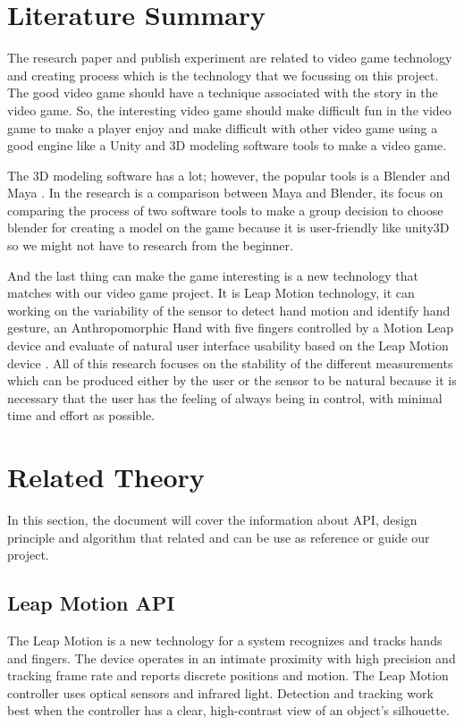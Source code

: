 \documentclass[journal]{IEEEtran}										    %
\begin{document}
    \section{Literature Summary}                                            %
        The research paper and publish experiment are related to video game 
        technology and creating process which is the technology that we 
        focussing on this project. The good video game should have a technique 
        associated with the story in the video game. So, the interesting 
        video game should make difficult fun in the video game to make a player 
        enjoy and make difficult with other video game \cite{TAG5} using a good engine 
        like a Unity and 3D modeling software tools to make a video game.

        The 3D modeling software has a lot; however, the popular tools is a 
        Blender and Maya \cite{TAG4}. In the research is a comparison between Maya 
        and Blender, its focus on comparing the process of two software tools 
        to make a group decision to choose blender for creating a model on 
        the game because it is user-friendly like unity3D so we might not 
        have to research from the beginner.

        And the last thing can make the game interesting is a new technology 
        that matches with our video game project. It is Leap Motion technology, 
        it can working on the variability of the sensor \cite{TAG1} to detect hand motion 
        and identify hand gesture, an Anthropomorphic Hand with five fingers 
        controlled by a Motion Leap device \cite{TAG2} and evaluate of natural user 
        interface usability based on the Leap Motion device \cite{TAG3}. All of this 
        research focuses on the stability of the different measurements which 
        can be produced either by the user or the sensor to be natural because 
        it is necessary that the user has the feeling of always being in control, 
        with minimal time and effort as possible.


        \section{Related Theory}
        In this section, the document will cover the information about API, design principle and algorithm
        that related and can be use as reference or guide our project.

            \subsection{Leap Motion API}
                The Leap Motion is a new technology for a system recognizes 
                and tracks hands and fingers. The device operates in an intimate 
                proximity with high precision and tracking frame rate and reports 
                discrete positions and motion. The Leap Motion controller uses 
                optical sensors and infrared light. Detection and tracking work 
                best when the controller has a clear, high-contrast view of an 
                object's silhouette.
\end{document}
